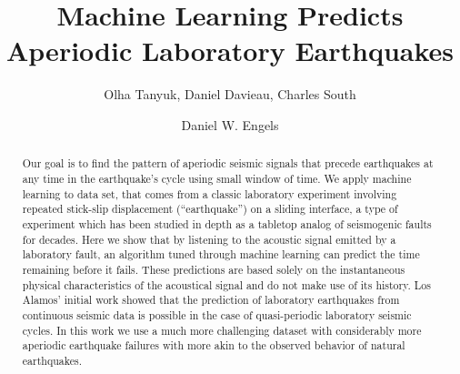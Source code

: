 \documentclass[]{llncs} %
\begin{document}

\title{Machine Learning Predicts Aperiodic Laboratory Earthquakes}
\author{Olha Tanyuk, Daniel Davieau, Charles South \and Daniel W. Engels}
\maketitle
\begin{abstract}
Our goal is to find the pattern of aperiodic seismic signals that precede earthquakes at any time in the earthquake’s cycle using small window of time. We apply machine learning to data set, that comes from a classic laboratory experiment involving repeated stick-slip displacement (“earthquake”) on a sliding interface, a type of experiment which has been studied in depth as a tabletop analog of seismogenic faults for decades. Here we show that by listening to the acoustic signal emitted by a laboratory fault, an algorithm tuned through machine learning can predict the time remaining before it fails. These predictions are based solely on the instantaneous physical characteristics of the acoustical signal and do not make use of its history. Los Alamos' initial work showed that the prediction of laboratory earthquakes from continuous seismic data is possible in the case of quasi-periodic laboratory seismic cycles. In this work we use a much more challenging dataset with considerably more aperiodic earthquake failures with more akin to the observed behavior of natural earthquakes. \par
	
\end{abstract}
\end{document}
